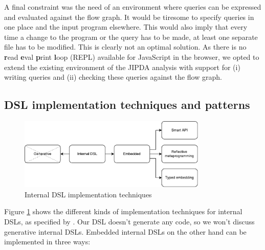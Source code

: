 A final constraint was the need of an environment where queries can be expressed and evaluated against the flow graph. It would be tiresome to specify queries in one place and the input program elsewhere. This would also imply that every time a change to the program or the query has to be made, at least one separate file has to be modified. This is clearly not an optimal solution. As there is no \textbf{r}ead \textbf{e}val \textbf{p}rint \textbf{l}oop (REPL) available for JavaScript in the browser, we opted to extend the existing environment of the JIPDA analysis with support for (i) writing queries and (ii) checking these queries against the flow graph.


\subsection{DSL implementation techniques and patterns}

\begin{figure}[!h]
    \centering
      \includegraphics[width=0.8\textwidth]{images/DSLTechniques} 
      \caption{Internal DSL implementation techniques}
    \label{fig:DSLTechniques}
\end{figure}

Figure \ref{fig:DSLTechniques} shows the different kinds of implementation techniques for internal DSLs, as specified by \cite{Ghosh:2010}. Our DSL doesn't generate any code, so we won't discuss generative internal DSLs. Embedded internal DSLs on the other hand can be implemented in three ways: 

